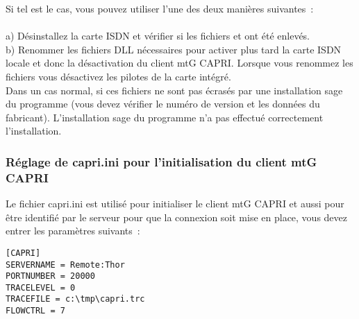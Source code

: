     Si tel est le cas, vous pouvez utiliser l'une des deux manières suivantes~: \\
	\\
    a) Désinstallez la carte ISDN et vérifier si les fichiers  et  ont été enlevés. \\
    b) Renommer les fichiers DLL nécessaires pour activer plus tard la carte ISDN locale et donc
	la désactivation du client mtG CAPRI. Lorsque vous renommez les fichiers vous désactivez les pilotes de la carte intégré. \\

    Dans un cas normal, si ces fichiers ne sont pas écrasés par une installation sage du programme
	(vous devez vérifier le numéro de version et les données du fabricant). L'installation sage du
	programme n'a pas effectué correctement l'installation.

\subsubsection{Réglage de capri.ini pour l'initialisation du client mtG CAPRI}

    Le fichier capri.ini est utilisé pour initialiser le client mtG CAPRI et aussi pour être identifié
	par le serveur pour que la connexion soit mise en place, vous devez entrer les paramètres suivants~:
\begin{verbatim}
[CAPRI]
SERVERNAME = Remote:Thor
PORTNUMBER = 20000
TRACELEVEL = 0
TRACEFILE = c:\tmp\capri.trc
FLOWCTRL = 7
\end{verbatim}

